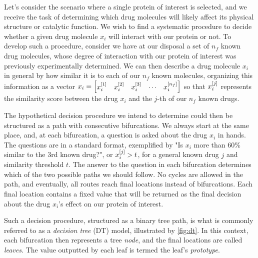 Let's consider the scenario where a single protein of interest is selected, and we receive the task of determining which drug molecules will likely affect its physical structure or catalytic function.
We wish to find a systematic procedure to decide whether a given drug molecule $x_i$ will interact with our protein or not. To develop such a procedure, consider we have at our disposal a set of $n_f$ known drug molecules, whose degree of interaction with our protein of interest was previously experimentally determined. We can then describe a drug molecule $x_i$ in general by how similar it is to each of our $n_f$ known molecules, organizing this information as a vector $x_i = \begin{bmatrix}x_i^{[1]} & x_i^{[2]} & x_i^{[3]} & \cdots & x_i^{[n_f]}\end{bmatrix}$ so that $x_i^{[j]}$ represents the similarity score between the drug $x_i$ and the $j$-th of our $n_f$ known drugs.

The hypothetical decision procedure we intend to determine could then be structured as a path with consecutive bifurcations. We always start at the same place, and, at each bifurcation, a question is asked about the drug $x_i$ in hands. The questions are in a standard format, exemplified by "Is $x_i$ more than 60\% similar to the 3rd known drug?", or $x_i^{[j]} > t$, for a general known drug $j$ and similarity threshold $t$. The answer to the question in each bifurcation determines which of the two possible paths we should follow. No cycles are allowed in the path, and eventually, all routes reach final locations instead of bifurcations. Each final location contains a fixed value that will be returned as the final decision about the drug $x_i$'s effect on our protein of interest.

Such a decision procedure, structured as a binary tree path, is what is commonly referred to as a \emph{decision tree} (DT) model, illustrated by \autoref{fig:dt}. 
In this context, each bifurcation then represents a tree \emph{node}, and the final locations are called \emph{leaves}. The value outputted by each leaf is termed the leaf's \emph{prototype}.
%

